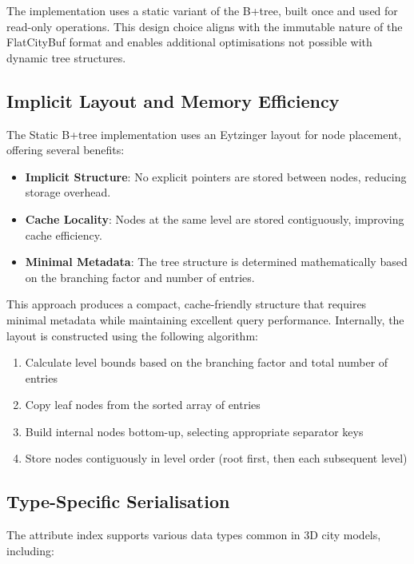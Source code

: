 The implementation uses a static variant of the B+tree, built once and used for read-only operations. This design choice aligns with the immutable nature of the FlatCityBuf format and enables additional optimisations not possible with dynamic tree structures.

\subsection{Implicit Layout and Memory Efficiency}
\label{methodology:attribute_index:implicit_layout}

The Static B+tree implementation uses an Eytzinger layout for node placement, offering several benefits:

\begin{itemize}
    \item \textbf{Implicit Structure}: No explicit pointers are stored between nodes, reducing storage overhead.
    \item \textbf{Cache Locality}: Nodes at the same level are stored contiguously, improving cache efficiency.
    \item \textbf{Minimal Metadata}: The tree structure is determined mathematically based on the branching factor and number of entries.
\end{itemize}

This approach produces a compact, cache-friendly structure that requires minimal metadata while maintaining excellent query performance. Internally, the layout is constructed using the following algorithm:

\begin{enumerate}
    \item Calculate level bounds based on the branching factor and total number of entries
    \item Copy leaf nodes from the sorted array of entries
    \item Build internal nodes bottom-up, selecting appropriate separator keys
    \item Store nodes contiguously in level order (root first, then each subsequent level)
\end{enumerate}

\subsection{Type-Specific Serialisation}
\label{methodology:attribute_index:type_specific_serialisation}

The attribute index supports various data types common in 3D city models, including:


